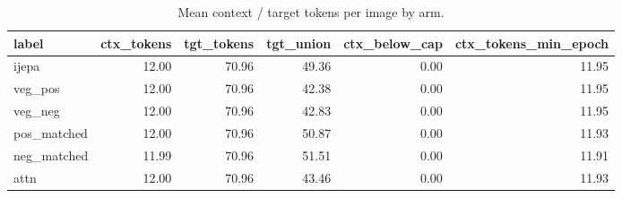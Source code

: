 \begin{table}[t]
\centering
\small
\caption{Mean context / target tokens per image by arm.}
\label{tab:token_budget}
\begin{tabular}{lrrrrr}
\toprule
label & ctx\_tokens & tgt\_tokens & tgt\_union & ctx\_below\_cap & ctx\_tokens\_min\_epoch \\
\midrule
ijepa & 12.00 & 70.96 & 49.36 & 0.00 & 11.95 \\
veg\_pos & 12.00 & 70.96 & 42.38 & 0.00 & 11.95 \\
veg\_neg & 12.00 & 70.96 & 42.83 & 0.00 & 11.95 \\
pos\_matched & 12.00 & 70.96 & 50.87 & 0.00 & 11.93 \\
neg\_matched & 11.99 & 70.96 & 51.51 & 0.00 & 11.91 \\
attn & 12.00 & 70.96 & 43.46 & 0.00 & 11.93 \\
\bottomrule
\end{tabular}
\end{table}
